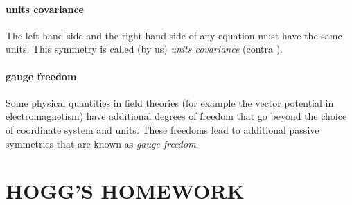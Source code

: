\documentclass{article}
\theoremstyle{plain}
\theoremstyle{definition}
\theoremstyle{remark}
\begin{document}
\paragraph{units covariance}
The left-hand side and the right-hand side of any equation must have the same units.
This symmetry is called (by us) \emph{units covariance} (contra \cite{villar2022dimensionless}).

\paragraph{gauge freedom}
Some physical quantities in field theories (for example the vector potential in electromagnetism) have additional degrees of freedom that go beyond the choice of coordinate system and units.
These freedoms lead to additional passive symmetries that are known as \emph{gauge freedom}.

\section{HOGG'S HOMEWORK}
\end{document}
